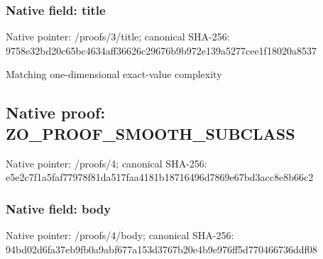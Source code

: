 \documentclass[10pt,a4paper]{article}
\begin{document}
\subsubsection{Native field: title}
Native pointer: /proofs/3/title; canonical SHA-256: 9758e32bd20c65bc4634aff36626c29676b9b972e139a5277cee1f18020a8537

\begingroup\raggedright\sloppy Matching one-dimensional exact-value complexity\par\endgroup

\subsection{Native proof: ZO\_\allowbreak{}PROOF\_\allowbreak{}SMOOTH\_\allowbreak{}SUBCLASS}
Native pointer: /proofs/4; canonical SHA-256: e5e2c7f1a5faf77978f81da517faa4181b18716496d7869e67bd3acc8e8b66c2

\subsubsection{Native field: body}
Native pointer: /proofs/4/body; canonical SHA-256: 94bd02d6fa37eb9fb0a9abf677a153d3767b20e4b9e976ff5d770466736ddf08
\end{document}
